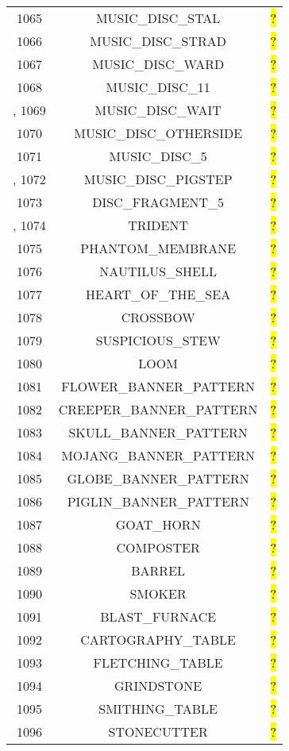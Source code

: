 \documentclass[11pt]{article}
\newcommand\myworries[1]{\sethlcolor{red}\hl{#1}}
\begin{document}
\begin{longtable}{ |c|c|c| }
1065 & MUSIC\_DISC\_STAL & \myworries{?} \\
1066 & MUSIC\_DISC\_STRAD & \myworries{?} \\
1067 & MUSIC\_DISC\_WARD & \myworries{?} \\
1068 & MUSIC\_DISC\_11 & \myworries{?} \\,
1069 & MUSIC\_DISC\_WAIT & \myworries{?} \\
1070 & MUSIC\_DISC\_OTHERSIDE & \myworries{?} \\
1071 & MUSIC\_DISC\_5 & \myworries{?} \\,
1072 & MUSIC\_DISC\_PIGSTEP & \myworries{?} \\
1073 & DISC\_FRAGMENT\_5 & \myworries{?} \\,
1074 & TRIDENT & \myworries{?} \\
1075 & PHANTOM\_MEMBRANE & \myworries{?} \\
1076 & NAUTILUS\_SHELL & \myworries{?} \\
1077 & HEART\_OF\_THE\_SEA & \myworries{?} \\
1078 & CROSSBOW & \myworries{?} \\
1079 & SUSPICIOUS\_STEW & \myworries{?} \\
1080 & LOOM & \myworries{?} \\
1081 & FLOWER\_BANNER\_PATTERN & \myworries{?} \\
1082 & CREEPER\_BANNER\_PATTERN & \myworries{?} \\
1083 & SKULL\_BANNER\_PATTERN & \myworries{?} \\
1084 & MOJANG\_BANNER\_PATTERN & \myworries{?} \\
1085 & GLOBE\_BANNER\_PATTERN & \myworries{?} \\
1086 & PIGLIN\_BANNER\_PATTERN & \myworries{?} \\
1087 & GOAT\_HORN & \myworries{?} \\
1088 & COMPOSTER & \myworries{?} \\
1089 & BARREL & \myworries{?} \\
1090 & SMOKER & \myworries{?} \\
1091 & BLAST\_FURNACE & \myworries{?} \\
1092 & CARTOGRAPHY\_TABLE & \myworries{?} \\
1093 & FLETCHING\_TABLE & \myworries{?} \\
1094 & GRINDSTONE & \myworries{?} \\
1095 & SMITHING\_TABLE & \myworries{?} \\
1096 & STONECUTTER & \myworries{?} \\

\end{longtable}
\end{document}
